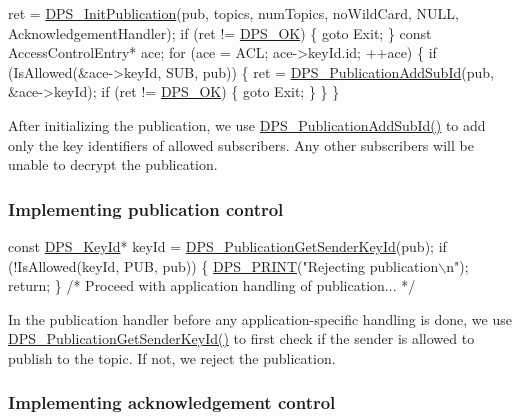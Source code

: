 \begin{DoxyCodeInclude}
    ret = \hyperlink{group__publication_ga7b0709e28cb34d5a30b90e4142cd6c19}{DPS\_InitPublication}(pub, topics, numTopics, noWildCard, NULL, 
      AcknowledgementHandler);
    \textcolor{keywordflow}{if} (ret != \hyperlink{group__status_ga0ea3dd37bc558859ae0cb5a4f79a4bdd}{DPS\_OK}) \{
        \textcolor{keywordflow}{goto} Exit;
    \}
    \textcolor{keyword}{const} AccessControlEntry* ace;
    \textcolor{keywordflow}{for} (ace = ACL; ace->keyId.id; ++ace) \{
        \textcolor{keywordflow}{if} (IsAllowed(&ace->keyId, SUB, pub)) \{
            ret = \hyperlink{group__publication_ga91471ddf6f66798e255b28b3e913144b}{DPS\_PublicationAddSubId}(pub, &ace->keyId);
            \textcolor{keywordflow}{if} (ret != \hyperlink{group__status_ga0ea3dd37bc558859ae0cb5a4f79a4bdd}{DPS\_OK}) \{
                \textcolor{keywordflow}{goto} Exit;
            \}
        \}
    \}
\end{DoxyCodeInclude}
After initializing the publication, we use \hyperlink{group__publication_ga91471ddf6f66798e255b28b3e913144b}{D\+P\+S\+\_\+\+Publication\+Add\+Sub\+Id()} to add only the key identifiers of allowed subscribers. Any other subscribers will be unable to decrypt the publication.\hypertarget{tutorials-security_implementing-publication-control}{}\subsubsection{Implementing publication control}\label{tutorials-security_implementing-publication-control}

\begin{DoxyCodeInclude}
    \textcolor{keyword}{const} \hyperlink{struct___d_p_s___key_id}{DPS\_KeyId}* keyId = \hyperlink{group__publication_ga1d7e81c2f0b19736a4f7a7195e5bd98d}{DPS\_PublicationGetSenderKeyId}(pub);
    \textcolor{keywordflow}{if} (!IsAllowed(keyId, PUB, pub)) \{
        \hyperlink{group__debug_gaf1d25cc7f1d2d92f96ba620217af28fd}{DPS\_PRINT}(\textcolor{stringliteral}{"Rejecting publication\(\backslash\)n"});
        \textcolor{keywordflow}{return};
    \}
    \textcolor{comment}{/* Proceed with application handling of publication... */}
\end{DoxyCodeInclude}
In the publication handler before any application-\/specific handling is done, we use \hyperlink{group__publication_ga1d7e81c2f0b19736a4f7a7195e5bd98d}{D\+P\+S\+\_\+\+Publication\+Get\+Sender\+Key\+Id()} to first check if the sender is allowed to publish to the topic. If not, we reject the publication.\hypertarget{tutorials-security_implementing-acknowledgement-control}{}\subsubsection{Implementing acknowledgement control}\label{tutorials-security_implementing-acknowledgement-control}

